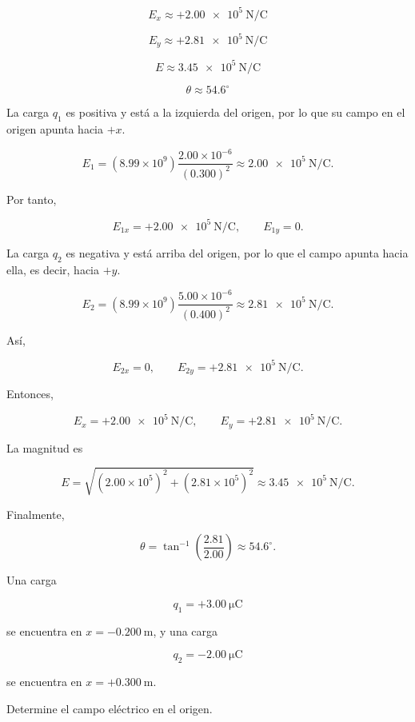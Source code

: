 \begin{respuesta}

\[
\boxed{E_x\approx+\SI{2.00e5}{\newton\per\coulomb}}
\]

\[
\boxed{E_y\approx+\SI{2.81e5}{\newton\per\coulomb}}
\]

\[
\boxed{E\approx\SI{3.45e5}{\newton\per\coulomb}}
\]

\[
\boxed{\theta\approx54.6^\circ}
\]

\end{respuesta}

\begin{explicacion}

La carga \(q_1\) es positiva y está a la izquierda del origen, por lo que su campo en el origen apunta hacia \(+x\).

\[
E_1=(8.99\times10^9)\frac{2.00\times10^{-6}}{(0.300)^2}
\approx\SI{2.00e5}{\newton\per\coulomb}.
\]

Por tanto,

\[
E_{1x}=+\SI{2.00e5}{\newton\per\coulomb},\qquad E_{1y}=0.
\]

La carga \(q_2\) es negativa y está arriba del origen, por lo que el campo apunta hacia ella, es decir, hacia \(+y\).

\[
E_2=(8.99\times10^9)\frac{5.00\times10^{-6}}{(0.400)^2}
\approx\SI{2.81e5}{\newton\per\coulomb}.
\]

Así,

\[
E_{2x}=0,\qquad E_{2y}=+\SI{2.81e5}{\newton\per\coulomb}.
\]

Entonces,

\[
E_x=+\SI{2.00e5}{\newton\per\coulomb},
\qquad
E_y=+\SI{2.81e5}{\newton\per\coulomb}.
\]

La magnitud es

\[
E=\sqrt{(2.00\times10^5)^2+(2.81\times10^5)^2}
\approx\SI{3.45e5}{\newton\per\coulomb}.
\]

Finalmente,

\[
\theta=\tan^{-1}\left(\frac{2.81}{2.00}\right)\approx54.6^\circ.
\]

\end{explicacion}


\begin{ejercicio}

Una carga

\[
q_1=+\SI{3.00}{\micro\coulomb}
\]

se encuentra en \(x=-\SI{0.200}{\metre}\), y una carga

\[
q_2=-\SI{2.00}{\micro\coulomb}
\]

se encuentra en \(x=+\SI{0.300}{\metre}\).

Determine el campo eléctrico en el origen.

\end{ejercicio}

